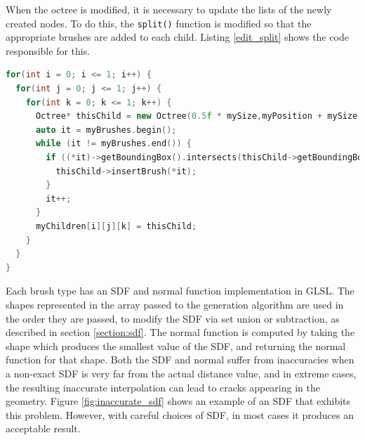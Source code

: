 \documentclass[11pt]{article}
\begin{document}
When the octree is modified, it is necessary to update the lists of the newly created nodes. To do this, the \texttt{split()} function is modified so that the appropriate brushes are added to each child. Listing \ref{edit_split} shows the code responsible for this.

\begin{lstlisting}[language=C++,label={edit_split},caption={Snippet from \texttt{split}, showing how brushes are associated with child nodes, when they are created.}]
for(int i = 0; i <= 1; i++) {
  for(int j = 0; j <= 1; j++) {
    for(int k = 0; k <= 1; k++) {
      Octree* thisChild = new Octree(0.5f * mySize,myPosition + mySize * 0.5f * glm::vec3(i,j,k), myDetailLevel + 1,myGenerator,this,glm::uvec3(i,j,k));
      auto it = myBrushes.begin();
      while (it != myBrushes.end()) {
        if ((*it)->getBoundingBox().intersects(thisChild->getBoundingBox())) {
          thisChild->insertBrush(*it);
        }
        it++;
      }
      myChildren[i][j][k] = thisChild;
    }
  }
}
\end{lstlisting}

Each brush type has an SDF and normal function implementation in GLSL. The shapes represented in the array passed to the generation algorithm are used in the order they are passed, to modify the SDF via set union or subtraction, as described in section \ref{section:sdf}. The normal function is computed by taking the shape which produces the smallest value of the SDF, and returning the normal function for that shape. Both the SDF and normal suffer from inaccuracies when a non-exact SDF is very far from the actual distance value, and in extreme cases, the resulting inaccurate interpolation can lead to cracks appearing in the geometry. Figure \ref{fig:inaccurate_sdf} shows an example of an SDF that exhibits this problem. However, with careful choices of SDF, in most cases it produces an acceptable result.
\end{document}
